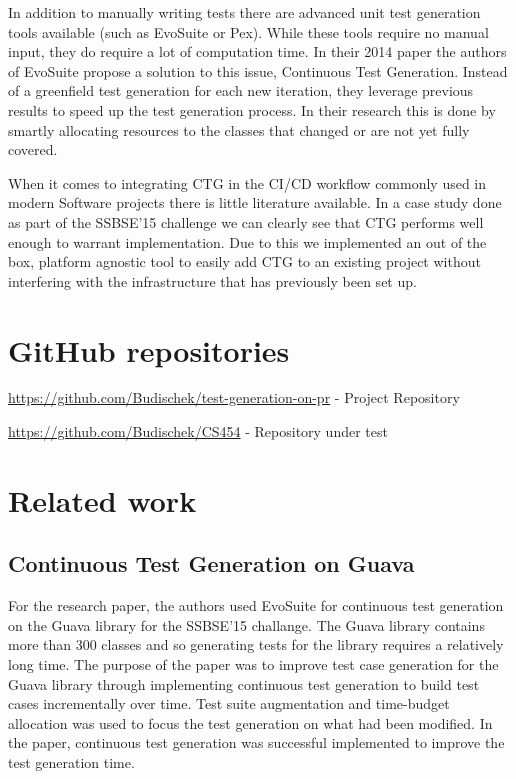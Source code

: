\documentclass[12pt, a4paper]{article}
\begin{document}
In addition to manually writing tests there are advanced unit test generation tools available (such as EvoSuite or Pex). While these tools require no manual input, they do require a lot of computation time. In their 2014 paper \cite{campos_continuous_2014} the authors of EvoSuite propose a solution to this issue, Continuous Test Generation. Instead of a greenfield test generation for each new iteration, they leverage previous results to speed up the test generation process. In their research this is done by smartly allocating resources to the classes that changed or are not yet fully covered.

When it comes to integrating CTG in the CI/CD workflow commonly used in modern Software projects there is little literature available. In a case study done as part of the SSBSE'15 challenge \cite{barros_continuous_2015} we can clearly see that CTG performs well enough to warrant implementation. Due to this we implemented an out of the box, platform agnostic tool to easily add CTG to an existing project without interfering with the infrastructure that has previously been set up.



\section{GitHub repositories}
\url{https://github.com/Budischek/test-generation-on-pr} - Project Repository

\url{https://github.com/Budischek/CS454} - Repository under test



\section{Related work}
\subsection{Continuous Test Generation on Guava}
For the \cite{barros_continuous_2015} research paper, the authors used EvoSuite for continuous test generation on the Guava library for the SSBSE'15 challange. The Guava library contains more than 300 classes and so generating tests for the library requires a relatively long time. The purpose of the paper was to improve test case generation for the Guava library through implementing continuous test generation to build test cases incrementally over time. Test suite augmentation and time-budget allocation was used to focus the test generation on what had been modified. In the paper, continuous test generation was successful implemented to improve the test generation time.
\end{document}
